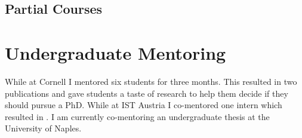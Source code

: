 \documentclass[11pt,a4paper,sans]{moderncv}
\begin{document}




\subsection{Partial Courses}






\iffalse $1998$ and $1999$: Stages $1$, $2$ and $3$ in the Mathematics \\
	 $1999$: Assistant tutor for `Discrete Mathematics', Stage $2$
	Mathematics\\
	 $1999$: Demonstrator for `Combinatorial Computing', Stage $3$
	Mathematics\\
\fi



\section{Undergraduate Mentoring}
While at Cornell I mentored six students for three months. This resulted in two publications \cite{DBLP:journals/tcs/GrinshpunPRT14,DBLP:journals/corr/abs-1210-2462} and gave students a taste of research to help them decide if they should pursue a PhD. While at IST Austria I co-mentored one intern which resulted in \cite{DBLP:conf/lata/ChatterjeeCR13}. I am currently co-mentoring an undergraduate thesis at the University of Naples.
\end{document}
